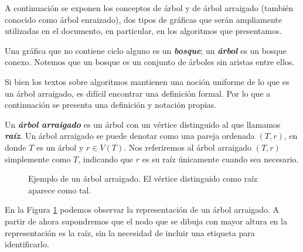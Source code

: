 A continuación se exponen los conceptos de árbol y de árbol arraigado (también conocido como árbol enraizado), dos tipos de gráficas que serán ampliamente utilizadas en el documento, en particular, en los algoritmos que presentamos.

Una gráfica que no contiene ciclo alguno es un \emph{\textbf{bosque}}; un \emph{\textbf{árbol}} es un bosque conexo. Notemos que un bosque es un conjunto de árboles sin aristas entre ellos.

Si bien los textos sobre algoritmos mantienen una noción uniforme de lo que es un árbol arraigado, es difícil encontrar una definición formal. Por lo que a continuación se presenta una definición y notación propias.

Un \textbf{\emph{árbol arraigado}} es un árbol con un vértice distinguido al que llamamos \textbf{\emph{raíz}}. Un árbol arraigado se puede denotar como una pareja ordenada $(T,r)$, en donde $T$ es un árbol y $r \in V(T)$. Nos referiremos al árbol arraigado $(T,r)$ simplemente como $T$, indicando que $r$ es su raíz únicamente cuando sea necesario.

\begin{figure}[!htbp]
\centering
\begin{subfigure}{\textwidth}
\centering
{}
\end{subfigure}
\caption{Ejemplo de un árbol arraigado. El vértice distinguido como raíz aparece como tal.}
\label{fig_ejemplo_arbol}
\end{figure}

En la Figura \ref{fig_ejemplo_arbol} podemos observar la representación de un árbol arraigado. A partir de ahora supondremos que el nodo que se dibuja con mayor altura en la representación es la raíz, sin la necesidad de incluir una etiqueta para identificarlo.

